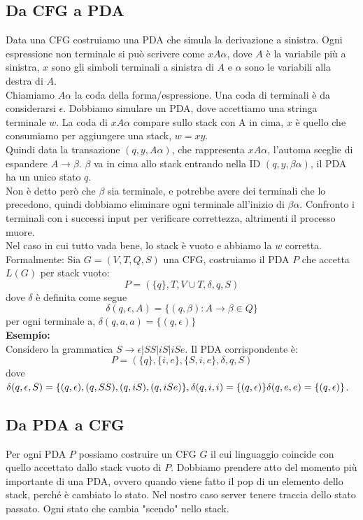 \documentclass[12pt]{article}
\begin{document}
\subsection{Da CFG a PDA}
Data una CFG costruiamo una PDA che simula la derivazione a sinistra. Ogni espressione non terminale si può scrivere come $xA\alpha$, dove $A$ è la variabile più a sinistra, $x$ sono gli simboli terminali a sinistra di $A$ e $\alpha$ sono le variabili alla destra di $A$.
\\ 
Chiamiamo $A\alpha$ la coda della forma/espressione. Una coda di terminali è da considerarsi $\epsilon$. Dobbiamo simulare un PDA, dove accettiamo una stringa terminale $w$. La coda di $xA\alpha$ compare sullo stack con A in cima, $x$ è quello che consumiamo per aggiungere una stack, $w=xy$.
\\ Quindi data la transazione $(q,y,A\alpha)$, che rappresenta $xA\alpha$, l'automa sceglie di espandere $A \rightarrow \beta$. $\beta$ va in cima allo stack entrando nella ID $(q,y,\beta \alpha)$, il PDA ha un unico stato $q$.
\\ Non è detto però che $\beta$ sia terminale, e potrebbe avere dei terminali che lo precedono, quindi dobbiamo eliminare ogni terminale all'inizio di $\beta \alpha$. Confronto i terminali con i successi input per verificare correttezza, altrimenti il processo muore. 
\\ Nel caso in cui tutto vada bene, lo stack è vuoto e abbiamo la $w$ corretta. 
\\ Formalmente: Sia $G=(V,T,Q,S)$ una CFG, costruiamo il PDA $P$ che accetta $L(G)$ per stack vuoto: 
\[ P = (\{q\},T,V \cup T, \delta, q, S) \]
dove $\delta$ è definita come segue 
\[\delta(q,\epsilon,A) = \{(q,\beta): A \rightarrow \beta \in Q\}\]
per ogni terminale a, $\delta(q,a,a) = \{(q, \epsilon)\}$
\\ \textbf{Esempio:} 
\\ Considero la grammatica $S \rightarrow \epsilon|SS|iS|iSe$. Il PDA corrispondente è: 
\[ P = (\{q\}, \{i,e\}, \{S,i,e\},\delta,q,S)\]
dove $\delta(q,\epsilon,S)=\{(q,\epsilon),(q,SS),(q,iS),(q,iSe)\}, \delta(q,i,i)=\{(q,\epsilon)\} 
\\ \delta(q,e,e)=\{(q,\epsilon)\}$.

\subsection{Da PDA a CFG}
Per ogni PDA $P$ possiamo costruire un CFG $G$ il cui linguaggio coincide con quello accettato dallo stack vuoto di $P$. Dobbiamo prendere atto del momento più importante di una PDA, ovvero quando viene fatto il pop di un elemento dello stack, perché è cambiato lo stato. Nel nostro caso server tenere traccia dello stato passato. Ogni stato che cambia "scendo" nello stack.
\end{document}
